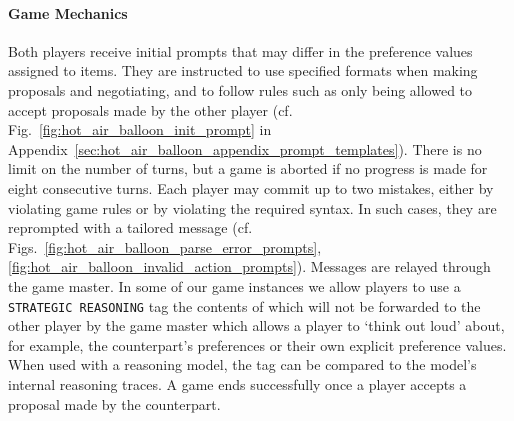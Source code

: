 \paragraph{Game Mechanics}
Both players receive initial prompts that may differ in the preference values assigned to items. They are instructed to use specified formats when making proposals and negotiating, and to follow rules such as only being allowed to accept proposals made by the other player (cf. Fig.~\ref{fig:hot_air_balloon_init_prompt} in Appendix~\ref{sec:hot_air_balloon_appendix_prompt_templates}). 
There is no limit on the number of turns, but a game is aborted if no progress is made for eight consecutive turns. Each player may commit up to two mistakes, either by violating game rules or by violating the required syntax. In such cases, they are reprompted with a tailored message (cf. Figs.~\ref{fig:hot_air_balloon_parse_error_prompts}, \ref{fig:hot_air_balloon_invalid_action_prompts}). 
Messages are relayed through the game master. In some of our game instances we allow players to use a \texttt{STRATEGIC REASONING} tag the contents of which will not be forwarded to the other player by the game master which allows a player to `think out loud' about, for example, the counterpart's preferences or their own explicit preference values. When used with a reasoning model, the tag can be compared to the model’s internal reasoning traces. 
A game ends successfully once a player accepts a proposal made by the counterpart.
